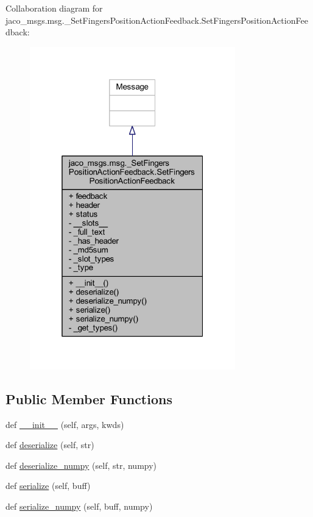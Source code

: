 Collaboration diagram for jaco\+\_\+msgs.\+msg.\+\_\+\+Set\+Fingers\+Position\+Action\+Feedback.\+Set\+Fingers\+Position\+Action\+Feedback\+:
\nopagebreak
\begin{figure}[H]
\begin{center}
\leavevmode
\includegraphics[width=253pt]{d3/ddc/classjaco__msgs_1_1msg_1_1__SetFingersPositionActionFeedback_1_1SetFingersPositionActionFeedback__coll__graph}
\end{center}
\end{figure}
\subsection*{Public Member Functions}
\begin{DoxyCompactItemize}
\item 
def \hyperlink{classjaco__msgs_1_1msg_1_1__SetFingersPositionActionFeedback_1_1SetFingersPositionActionFeedback_a27da93450acfe8e8f051851c8fc77863}{\+\_\+\+\_\+init\+\_\+\+\_\+} (self, args, kwds)
\item 
def \hyperlink{classjaco__msgs_1_1msg_1_1__SetFingersPositionActionFeedback_1_1SetFingersPositionActionFeedback_aed36c7a85ca0a47b6efd55d78d56cf9e}{deserialize} (self, str)
\item 
def \hyperlink{classjaco__msgs_1_1msg_1_1__SetFingersPositionActionFeedback_1_1SetFingersPositionActionFeedback_aaf5174ea05e5d92cbffe7f1e7cb3b0a2}{deserialize\+\_\+numpy} (self, str, numpy)
\item 
def \hyperlink{classjaco__msgs_1_1msg_1_1__SetFingersPositionActionFeedback_1_1SetFingersPositionActionFeedback_a5a324771ef86697201ccbe9170d32f2c}{serialize} (self, buff)
\item 
def \hyperlink{classjaco__msgs_1_1msg_1_1__SetFingersPositionActionFeedback_1_1SetFingersPositionActionFeedback_a107f143a7d42c6b858fe60c646cefd63}{serialize\+\_\+numpy} (self, buff, numpy)
\end{DoxyCompactItemize}
